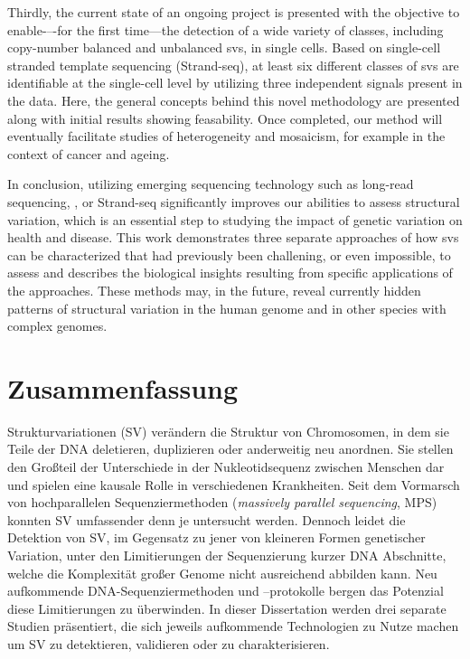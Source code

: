 Thirdly, the current state of an ongoing project is presented with the objective
to enable-–-for the first time---the detection of a wide variety of \sv classes,
including copy-number balanced and unbalanced \acp{sv}, in single cells. Based on
single-cell stranded template sequencing (Strand-seq), at least six different
classes of \acp{sv} are identifiable at the single-cell level by utilizing three
independent signals present in the data. Here, the general concepts behind this
novel methodology are presented along with initial results showing feasability.
Once completed, our method will eventually facilitate studies of \sv
heterogeneity and mosaicism, for example in the context of cancer and ageing.

In conclusion, utilizing emerging sequencing technology such as long-read
sequencing, \hic, or Strand-seq significantly improves our abilities to assess
structural variation, which is an essential step to studying the impact of
genetic variation on health and disease. This work demonstrates three separate
approaches of how \acp{sv} can be characterized that had previously been
challening, or even impossible, to assess and describes the biological insights
resulting from specific applications of the approaches. These methods may, in
the future, reveal currently hidden patterns of structural variation in the
human genome and in other species with complex genomes.




\cleardoublepage
{}
\chapter*{Zusammenfassung}%
%

Strukturvariationen (SV) verändern die Struktur von Chromosomen, in dem sie
Teile der DNA deletieren, duplizieren oder anderweitig neu anordnen. Sie stellen
den Großteil der Unterschiede in der Nukleotidsequenz zwischen Menschen dar und
spielen eine kausale Rolle in verschiedenen Krankheiten. Seit dem Vormarsch
von hochparallelen Sequenziermethoden (\textit{massively parallel sequencing},
MPS) konnten SV umfassender denn je untersucht werden. Dennoch leidet die Detektion von
SV, im Gegensatz zu jener von kleineren Formen genetischer Variation, unter den
Limitierungen der Sequenzierung kurzer DNA Abschnitte, welche die Komplexität
großer Genome nicht ausreichend abbilden kann. Neu aufkommende
DNA-Se\-quen\-zier\-me\-tho\-den und –protokolle bergen das Potenzial diese Limitierungen
zu überwinden. In dieser Dissertation werden drei separate Studien präsentiert,
die sich jeweils aufkommende Technologien zu Nutze machen um SV zu detektieren,
validieren oder zu charakterisieren.

